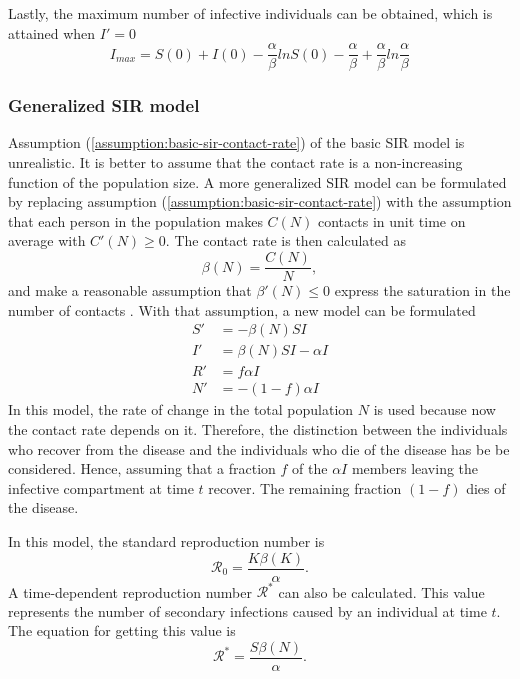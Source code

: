 Lastly, the maximum number of infective individuals can be obtained, which is attained when $I' = 0$ \cite{brauerCompartmentalModelsEpidemiology2008}
\begin{equation*}
    I_{max} = S(0) + I(0) - \frac{\alpha}{\beta} ln S(0) - \frac{\alpha}{\beta} + \frac{\alpha}{\beta} ln \frac{\alpha}{\beta}
\end{equation*}

\subsubsection{Generalized SIR model}
\label{sec:literature-review-generalized-sir-model}

Assumption (\ref{assumption:basic-sir-contact-rate}) of the basic \gls{SIR} model is unrealistic.
It is better to assume that the contact rate is a non-increasing function of the population size.
A more generalized \gls{SIR} model can be formulated by replacing assumption (\ref{assumption:basic-sir-contact-rate}) with the assumption that each person in the population makes $C(N)$ contacts in unit time on average with $C'(N) \geq 0$.
The contact rate is then calculated as
\begin{equation*}
    \beta(N) = \frac{C(N)}{N},
\end{equation*}
and make a reasonable assumption that $\beta'(N) \leq 0$ express the saturation in the number of contacts \cite{brauerCompartmentalModelsEpidemiology2008}.
With that assumption, a new model can be formulated
\begin{align*}
    S' &= - \beta(N)SI \\
    I' &= \beta(N)SI - \alpha I \\
    R' &= f \alpha I \\
    N' &= - (1 - f) \alpha I
\end{align*}
In this model, the rate of change in the total population $N$ is used because now the contact rate depends on it.
Therefore, the distinction between the individuals who recover from the disease and the individuals who die of the disease has be be considered.
Hence, assuming that a fraction $f$ of the $\alpha I$ members leaving the infective compartment at time $t$ recover.
The remaining fraction $(1 - f)$ dies of the disease.

In this model, the standard reproduction number is \cite{brauerCompartmentalModelsEpidemiology2008}
\begin{equation}
    \mathcal{R}_0 = \frac{K\beta(K)}{\alpha}.
    \label{eq:generalized-sir-r0}
\end{equation}
A time-dependent reproduction number $\mathcal{R}^*$ can also be calculated.
This value represents the number of secondary infections caused by an individual at time $t$.
The equation for getting this value is \cite{brauerCompartmentalModelsEpidemiology2008}
\begin{equation*}
    \mathcal{R}^* = \frac{S\beta(N)}{\alpha}.
\end{equation*}

